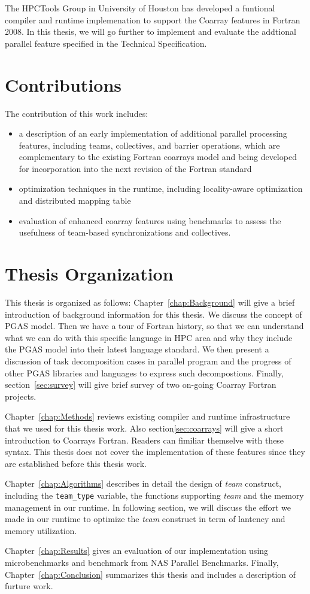 The HPCTools Group in University of Houston has developed a funtional compiler and runtime implemenation to support the Coarray features in Fortran 2008\cite{EachempatiCAF2010}. In this thesis, we will go further to implement and evaluate the addtional parallel feature specified in the Technical Specification. 
\section{Contributions}
The contribution of this work includes:
\begin{itemize}
\item a description of an early implementation of additional parallel processing features, including teams, collectives, and barrier operations, which are complementary to the existing Fortran coarrays model and being developed for incorporation into the next revision of the Fortran standard
\item optimization techniques in the runtime, including locality-aware optimization and distributed mapping table
\item evaluation of enhanced coarray features using benchmarks to assess the usefulness of team-based synchronizations and collectives.
\end{itemize}
\section{Thesis Organization}
This thesis is organized as follows:
Chapter~\ref{chap:Background} will give a brief introduction of background information for this thesis. We discuss the concept of PGAS model. Then we have a tour of Fortran history, so that we can understand what we can do with this specific language in HPC area and why they include the PGAS model into their latest language standard. We then present a discussion of task decomposition cases in parallel program and the progress of other PGAS libraries and languages to express such decompostions. Finally, section~\ref{sec:survey} will give brief survey of two on-going Coarray Fortran projects. 

Chapter~\ref{chap:Methods} reviews existing compiler and runtime infrastructure that we used for this thesis work. Also section\ref{sec:coarrays} will give a short introduction to Coarrays Fortran. Readers can fimiliar themselve with these syntax. This thesis does not cover the implementation of these features since they are established before this thesis work. 

Chapter~\ref{chap:Algorithms} describes in detail the design of \textit{team} construct, including the \texttt{team\_type} variable, the functions supporting \textit{team} and the memory management in our runtime. In following section, we will discuss the effort we made in our runtime to optimize the \textit{team} construct in term of lantency and memory utilization.

 Chapter~\ref{chap:Results} gives an evaluation of our implementation using microbenchmarks and benchmark from NAS Parallel Benchmarks. Finally, Chapter~\ref{chap:Conclusion} summarizes this thesis and includes a description of furture work. 